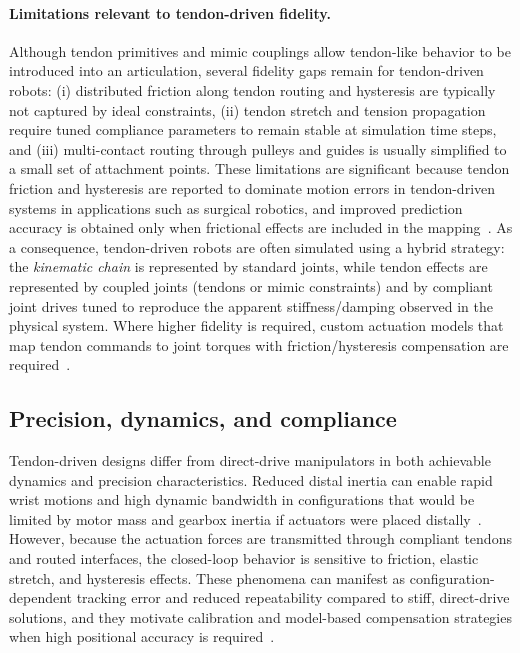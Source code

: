 \paragraph{Limitations relevant to tendon-driven fidelity.}
Although tendon primitives and mimic couplings allow tendon-like behavior to be introduced into an articulation, several fidelity gaps remain for tendon-driven robots:
(i) distributed friction along tendon routing and hysteresis are typically not captured by ideal constraints, (ii) tendon stretch and tension propagation require tuned compliance parameters to remain stable at simulation time steps, and (iii) multi-contact routing through pulleys and guides is usually simplified to a small set of attachment points. These limitations are significant because tendon friction and hysteresis are reported to dominate motion errors in tendon-driven systems in applications such as surgical robotics, and improved prediction accuracy is obtained only when frictional effects are included in the mapping~\cite{Kato2016Neuroendoscopy,Miyasaka2020HysteresisFriction}.
As a consequence, tendon-driven robots are often simulated using a hybrid strategy: the \emph{kinematic chain} is represented by standard joints, while tendon effects are represented by coupled joints (tendons or mimic constraints) and by compliant joint drives tuned to reproduce the apparent stiffness/damping observed in the physical system. Where higher fidelity is required, custom actuation models that map tendon commands to joint torques with friction/hysteresis compensation are required~\cite{Miyasaka2020HysteresisFriction}. %

\subsection{Precision, dynamics, and compliance}

Tendon-driven designs differ from direct-drive manipulators in both achievable dynamics and precision characteristics. Reduced distal inertia can enable rapid wrist motions and high dynamic bandwidth in configurations that would be limited by motor mass and gearbox inertia if actuators were placed distally~\cite{Nemoto2022CableWrist}. However, because the actuation forces are transmitted through compliant tendons and routed interfaces, the closed-loop behavior is sensitive to friction, elastic stretch, and hysteresis effects. These phenomena can manifest as configuration-dependent tracking error and reduced repeatability compared to stiff, direct-drive solutions, and they motivate calibration and model-based compensation strategies when high positional accuracy is required~\cite{Miyasaka2020HysteresisFriction,Kato2016Neuroendoscopy}.

